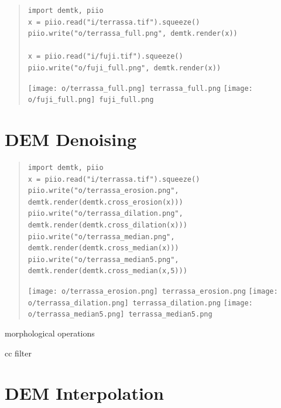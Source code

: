 \begin{quote}
\begin{verbatim}
import demtk, piio
x = piio.read("i/terrassa.tif").squeeze()
piio.write("o/terrassa_full.png", demtk.render(x))

x = piio.read("i/fuji.tif").squeeze()
piio.write("o/fuji_full.png", demtk.render(x))
\end{verbatim}
\texttt{[image: o/terrassa\_full.png]}~\verb+terrassa_full.png+
\texttt{[image: o/fuji\_full.png]}~\verb+fuji_full.png+
\end{quote}



\section{DEM Denoising}

\begin{quote}
\begin{verbatim}
import demtk, piio
x = piio.read("i/terrassa.tif").squeeze()
piio.write("o/terrassa_erosion.png",  demtk.render(demtk.cross_erosion(x)))
piio.write("o/terrassa_dilation.png", demtk.render(demtk.cross_dilation(x)))
piio.write("o/terrassa_median.png", demtk.render(demtk.cross_median(x)))
piio.write("o/terrassa_median5.png", demtk.render(demtk.cross_median(x,5)))
\end{verbatim}
\texttt{[image: o/terrassa\_erosion.png]}~\verb+terrassa_erosion.png+
\texttt{[image: o/terrassa\_dilation.png]}~\verb+terrassa_dilation.png+
\texttt{[image: o/terrassa\_median5.png]}~\verb+terrassa_median5.png+
\end{quote}


morphological operations

cc filter


\section{DEM Interpolation}

